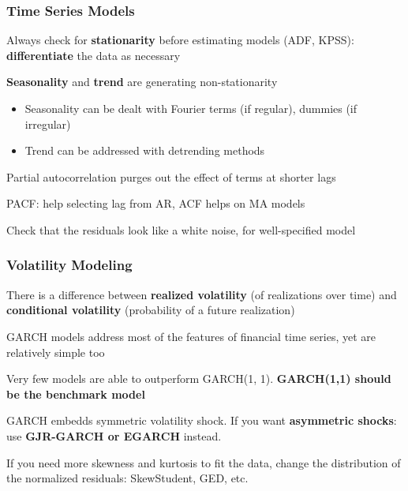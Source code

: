 \documentclass{beamer}
\newenvironment{wideitemize}{\itemize\addtolength{\itemsep}{10pt}}{\enditemize}
\begin{document}
\begin{frame}
  \frametitle{Time Series Models}
  \begin{wideitemize}
  \item Always check for \textbf{stationarity} before estimating models (ADF, KPSS): \textbf{differentiate} the data as necessary
  \item \textbf{Seasonality} and \textbf{trend} are generating non-stationarity
    \begin{itemize}
    \item Seasonality can be dealt with Fourier terms (if regular), dummies (if irregular)
    \item Trend can be addressed with detrending methods
    \end{itemize}
  \item Partial autocorrelation purges out the effect of terms at shorter lags
  \item PACF: help selecting lag from AR, ACF helps on MA models
  \item Check that the residuals look like a white noise, for well-specified model
  \end{wideitemize}
\end{frame}


\begin{frame}
  \frametitle{Volatility Modeling}
  \begin{wideitemize}
    \item There is a difference between \textbf{realized volatility} (of realizations over time) and \textbf{conditional volatility} (probability of a future realization)
    \item GARCH models address most of the features of financial time series, yet are relatively simple too
    \item Very few models are able to outperform GARCH(1, 1). \textbf{GARCH(1,1) should be the benchmark model}
    \item GARCH embedds symmetric volatility shock. If you want \textbf{asymmetric shocks}: use \textbf{GJR-GARCH or EGARCH} instead.
    \item If you need more skewness and kurtosis to fit the data, change the distribution of the normalized residuals: SkewStudent, GED, etc.
  \end{wideitemize}
\end{frame}
\end{document}
